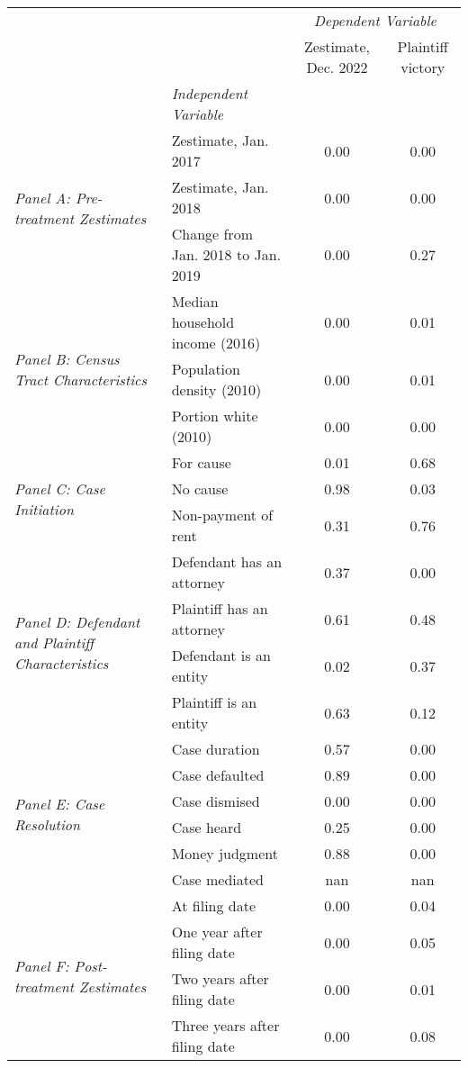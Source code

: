 \begin{tabular}{llcc}
\toprule
 &  & \multicolumn{2}{c}{\textit{Dependent Variable}} \\
 &  & Zestimate, Dec. 2022 & Plaintiff victory \\
 & \emph{Independent Variable} &  &  \\
\midrule
\multirow[c]{3}{3cm}{\textit{Panel A: Pre-treatment Zestimates}} & Zestimate, Jan. 2017 & 0.00 & 0.00 \\
 & Zestimate, Jan. 2018 & 0.00 & 0.00 \\
 & Change from Jan. 2018 to Jan. 2019 & 0.00 & 0.27 \\
\cline{1-4}
\multirow[c]{3}{3cm}{\textit{Panel B: Census Tract Characteristics}} & Median household income (2016) & 0.00 & 0.01 \\
 & Population density (2010) & 0.00 & 0.01 \\
 & Portion white (2010) & 0.00 & 0.00 \\
\cline{1-4}
\multirow[c]{3}{3cm}{\textit{Panel C: Case Initiation}} & For cause & 0.01 & 0.68 \\
 & No cause & 0.98 & 0.03 \\
 & Non-payment of rent & 0.31 & 0.76 \\
\cline{1-4}
\multirow[c]{4}{3cm}{\textit{Panel D: Defendant and Plaintiff Characteristics}} & Defendant has an attorney & 0.37 & 0.00 \\
 & Plaintiff has an attorney & 0.61 & 0.48 \\
 & Defendant is an entity & 0.02 & 0.37 \\
 & Plaintiff is an entity & 0.63 & 0.12 \\
\cline{1-4}
\multirow[c]{6}{3cm}{\textit{Panel E: Case Resolution}} & Case duration & 0.57 & 0.00 \\
 & Case defaulted & 0.89 & 0.00 \\
 & Case dismised & 0.00 & 0.00 \\
 & Case heard & 0.25 & 0.00 \\
 & Money judgment & 0.88 & 0.00 \\
 & Case mediated & nan & nan \\
\cline{1-4}
\multirow[c]{4}{3cm}{\textit{Panel F: Post-treatment Zestimates}} & At filing date & 0.00 & 0.04 \\
 & One year after filing date & 0.00 & 0.05 \\
 & Two years after filing date & 0.00 & 0.01 \\
 & Three years after filing date & 0.00 & 0.08 \\
\cline{1-4}
\bottomrule
\end{tabular}

